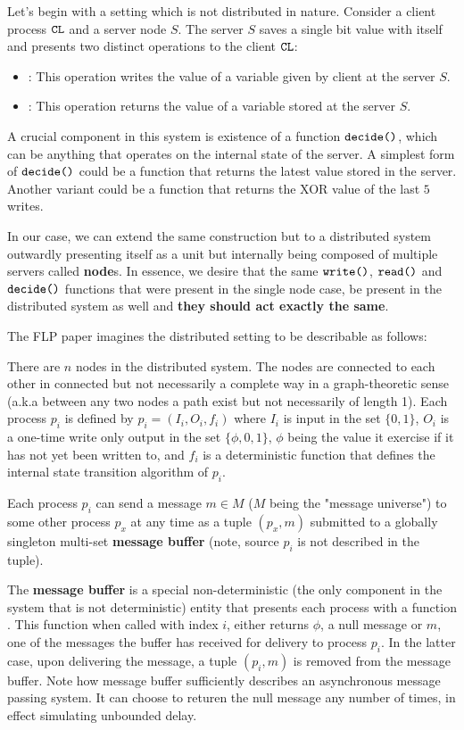 Let's begin with a setting which is not distributed in nature. Consider a client process $\verb|CL|$ and a server node $S$. The server $S$ saves a single bit value with itself and presents two distinct operations to the client $\verb|CL|$: 
\begin{itemize}
    \item {}: This operation writes the value of a variable given by client at the server $S$.
    \item {}: This operation returns the value of a variable stored at the server $S$.
\end{itemize}

A crucial component in this system is existence of a function $\verb|decide()|$, which can be anything that operates on the internal state of the server. A simplest form of $\verb|decide()|$ could be a function that returns the latest value stored in the server. Another variant could be a function that returns the XOR value of the last $5$ writes.

In our case, we can extend the same construction but to a distributed system outwardly presenting itself as a unit but internally being composed of multiple servers called \textbf{node}s. In essence, we desire that the same $\verb|write()|$, $\verb|read()|$ and $\verb|decide()|$ functions that were present in the single node case, be present in the distributed system as well and \textbf{they should act exactly the same}.

The FLP paper imagines the distributed setting to be describable as follows:

There are $n$ nodes in the distributed system. The nodes are connected to each other in connected but not necessarily a complete way in a graph-theoretic sense (a.k.a between any two nodes a path exist but not necessarily of length 1). Each process $p_i$ is defined by $p_i = (I_i, O_i, f_i)$ where $I_i$ is input in the set $\{0, 1\}$, $O_i$ is a one-time write only output in the set $\{\phi, 0, 1\}$, $\phi$ being the value it exercise if it has not yet been written to, and $f_i$ is a deterministic function that defines the internal state transition algorithm of $p_i$.

Each process $p_i$ can send a message $m \in M$ ($M$ being the "message universe") to some other process $p_x$ at any time as a tuple $(p_x, m)$ submitted to a globally singleton multi-set \textbf{message buffer} (note, source $p_i$ is not described in the tuple).

The \textbf{message buffer} is a special non-deterministic (the only component in the system that is not deterministic) entity that presents each process with a function . This function when called with index $i$, either returns $\phi$, a null message or $m$, one of the messages the buffer has received for delivery to process $p_i$. In the latter case, upon delivering the message, a tuple $(p_i, m)$ is removed from the message buffer. Note how message buffer sufficiently describes an asynchronous message passing system. It can choose to returen the null message any number of times, in effect simulating unbounded delay.

